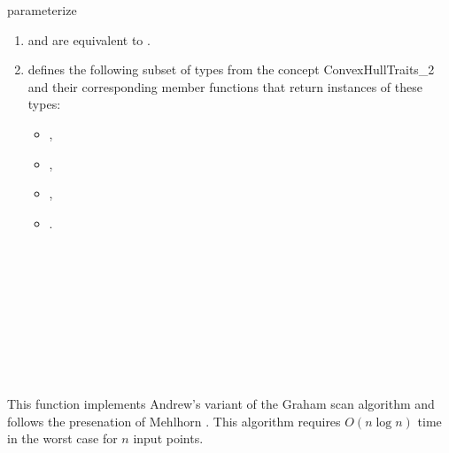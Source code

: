 \begin{ccRefFunction}{parameterize}
\begin{enumerate}
   \item    {} and 
            are equivalent to .
   \item    {} defines the following subset of types from
            the concept ConvexHullTraits\_2 and their corresponding member
            functions that return instances of these types:
            \begin{itemize}
                \item {},
                \item {}, 
                \item {},
		\item {}.
            \end{itemize}
\end{enumerate}

\ccSeeAlso

 \\
 \\
 \\
 \\
 \\
 \\
 \\
 \\

\ccImplementation
This function implements Andrew's variant of the Graham
scan algorithm \cite{a-aeach-79} and follows the presenation of Mehlhorn
\cite{m-mdscg-84}. This algorithm requires $O(n \log n)$ time 
in the worst case for $n$ input points.  

\end{ccRefFunction}


